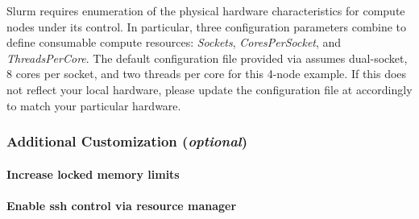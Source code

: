 \documentclass[letterpaper]{article}
\begin{document}
\begin{center}
\begin{tcolorbox}[]
  \small Slurm requires enumeration of the physical hardware characteristics
  for compute nodes under its control. In particular, three configuration
  parameters combine to define consumable compute resources: {\em Sockets},
  {\em CoresPerSocket}, and {\em ThreadsPerCore}. The default configuration
  file provided via \OHPC{} assumes dual-socket, 8 cores per socket, and two
  threads per core for this 4-node example. If this does not reflect your local
  hardware, please update the configuration file at
   accordingly to match your particular hardware.
\end{tcolorbox}
\end{center}




\subsubsection{Additional Customization ({\em optional})} \label{sec:addl_customizations}


\paragraph{Increase locked memory limits}


\paragraph{Enable ssh control via resource manager} 

\end{document}
